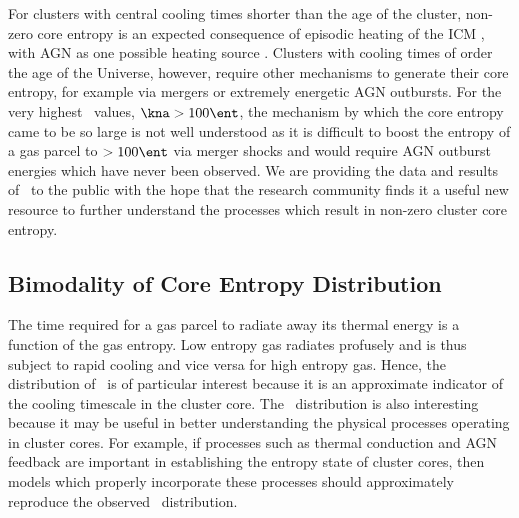 \documentclass{emulateapj}
\begin{document}
For clusters with central cooling times shorter than the age of the
cluster, non-zero core entropy is an expected consequence of episodic
heating of the ICM \citep{agnframework}, with AGN as one possible
heating source \citep{1997MNRAS.288..355B, 2000ApJ...532...17L,
2001Natur.414..425V, 2001ApJ...549..832S, 2002MNRAS.332..729C,
2002Natur.418..301B, 2002MNRAS.331..545B, 2002MNRAS.333..145N,
2002ApJ...581..223R, 2002MNRAS.335..610A, 2004MNRAS.348.1105O,
2004ApJ...613..811M, 2004ApJ...615..681R, 2004ApJ...617..896H,
2004MNRAS.355..995D, 2005ApJ...622..847S, pizzolato05,
2006ApJ...643..120B, 2006ApJ...638..659M}. Clusters with cooling times
of order the age of the Universe, however, require other mechanisms to
generate their core entropy, for example via mergers or extremely
energetic AGN outbursts. For the very highest \kna\ values, $\kna >
100 \ent$, the mechanism by which the core entropy came to be so large
is not well understood as it is difficult to boost the entropy of a
gas parcel to $> 100 \ent$ via merger shocks
\citep{2008MNRAS.386.1309M} and would require AGN outburst energies
which have never been observed. We are providing the data and results
of \accept\ to the public with the hope that the research community
finds it a useful new resource to further understand the processes
which result in non-zero cluster core entropy.

\subsection{Bimodality of Core Entropy Distribution}
\label{sec:bimod}

The time required for a gas parcel to radiate away its thermal energy
is a function of the gas entropy. Low entropy gas radiates profusely
and is thus subject to rapid cooling and vice versa for high entropy
gas. Hence, the distribution of \kna\ is of particular interest
because it is an approximate indicator of the cooling timescale in the
cluster core. The \kna\ distribution is also interesting because it
may be useful in better understanding the physical processes operating
in cluster cores. For example, if processes such as thermal conduction
and AGN feedback are important in establishing the entropy state of
cluster cores, then models which properly incorporate these processes
should approximately reproduce the observed \kna\ distribution.
\end{document}
